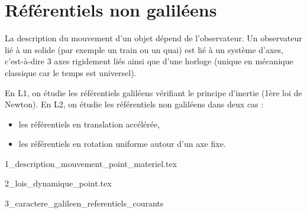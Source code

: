 \chapter{Référentiels non galiléens}

La description du mouvement d'un objet dépend de l'observateur. Un observateur lié à un solide (par exemple un train ou un quai) est lié à un système d'axes, c'est-à-dire 3 axes rigidement liés ainsi que d'une horloge (unique en mécanique classique car le temps est universel).

En L1, on étudie les référentiels galiléens vérifiant le principe d'inertie (1ère loi de Newton). En L2, on étudie les référentiels non galiléens dans deux cas :
\begin{itemize}
    \item les référentiels en translation accélérée,
    \item les référentiels en rotation uniforme autour d'un axe fixe.
\end{itemize}

\minitoc 

{1_description_mouvement_point_materiel.tex}

{2_lois_dynamique_point.tex}

{3_caractere_galileen_referentiels_courants}